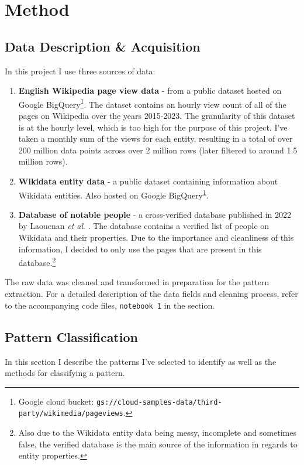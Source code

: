 \documentclass[titlepage]{article}
\begin{document}
\section{Method}
\subsection{Data Description \& Acquisition}
In this project I use three sources of data:
\begin{enumerate}
    \item \textbf{English Wikipedia page view data} - from a public dataset hosted on Google BigQuery\footnote{Google cloud bucket: \texttt{gs://cloud-samples-data/third-party/wikimedia/pageviews}.\label{footnote:bigquery}}. The dataset contains an hourly view count of all of the pages on Wikipedia over the years 2015-2023. The granularity of this dataset is at the hourly level, which is too high for the purpose of this project. I've taken a monthly sum of the views for each entity, resulting in a total of over 200 million data points across over 2 million rows (later filtered to around 1.5 million rows). 
    \item \textbf{Wikidata entity data} - a public dataset containing information about Wikidata entities. Also hosted on Google BigQuery\textsuperscript{\ref{footnote:bigquery}}.
    \item \textbf{Database of notable people} - a cross-verified database published in 2022 by Laouenan \textit{et al}. \cite{laouenan_cross-verified_2022}. The database contains a verified list of people on Wikidata and their properties. Due to the importance and cleanliness of this information, I decided to only use the pages that are present in this database.\footnote{Also due to the Wikidata entity data being messy, incomplete and sometimes false, the verified database is the main source of the information in regards to entity properties.}
\end{enumerate}

The raw data was cleaned and transformed in preparation for the pattern extraction. For a detailed description of the data fields and cleaning process, refer to the accompanying code files, \texttt{notebook 1} in the  section.


\subsection{Pattern Classification}
In this section I describe the patterns I've selected to identify as well as the methods for classifying a pattern.
\end{document}
